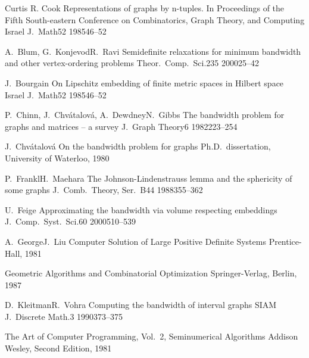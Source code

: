\documentclass[12pt,a4paper,titlepage,openany]{report}
\begin{document}
 \begin{thebibliography}{99}
\thispagestyle{fancy}

\articleInJournalOneAuthor
    {Curtis R. Cook}
    {Representations of graphs by n-tuples. In Proceedings of the Fifth South-eastern Conference on Combinatorics, Graph Theory, and Computing}
   {Israel J.~Math}{52}
   {1985}{46--52}

  \articleInJournalManyAuthors
    {A.~Blum, G.~Konjevod}{R.~Ravi}
    {Semidefinite relaxations for minimum bandwidth and other vertex-ordering problems}
   {Theor.~Comp.~Sci.}{235}
   {2000}{25--42}

\articleInJournalOneAuthor
    {J.~Bourgain}
    {On Lipschitz embedding of finite metric spaces in Hilbert space}
   {Israel J.~Math}{52}
   {1985}{46--52}

  \articleInJournalManyAuthors
    {P.~Chinn, J.~Chv\'atalov\'a, A.~Dewdney}{N.~Gibbs}
    {The bandwidth problem for graphs and matrices -- a survey}
   {J.~Graph Theory}{6}
   {1982}{223--254}

\PhDDissertation
    {J.~Chv\'atalov\'a}
    {On the bandwidth problem for graphs}
    {Ph.D.~dissertation, University of Waterloo, 1980}

  \articleInJournalTwoAuthors
    {P.~Frankl}{H.~Maehara}
    {The Johnson-Lindenstrauss lemma and the sphericity of some graphs}
   {J.~Comb.~Theory, Ser.~B}{44}
   {1988}{355--362}

  \articleInJournalOneAuthor
    {U.~Feige}
    {Approximating the bandwidth via volume respecting embeddings}
    {J.~Comp.~Syst.~Sci.}{60}
    {2000}{510--539}

  \bookTwoAuthors
  {A.~George}{J.~Liu}
   {Computer Solution of Large Positive Definite Systems}
    {Prentice-Hall, 1981}

   {Geometric Algorithms and Combinatorial Optimization}
    {Springer-Verlag, Berlin, 1987}

   \articleInJournalTwoAuthors
     {D.~Kleitman}{R.~Vohra}
     {Computing the bandwidth of interval graphs}
     {SIAM J.~Discrete Math.}{3}
     {1990}{373--375}

   {The Art of Computer Programming, Vol.~2, Seminumerical Algorithms}
    {Addison Wesley, Second Edition, 1981}


\end{thebibliography}
\end{document}
